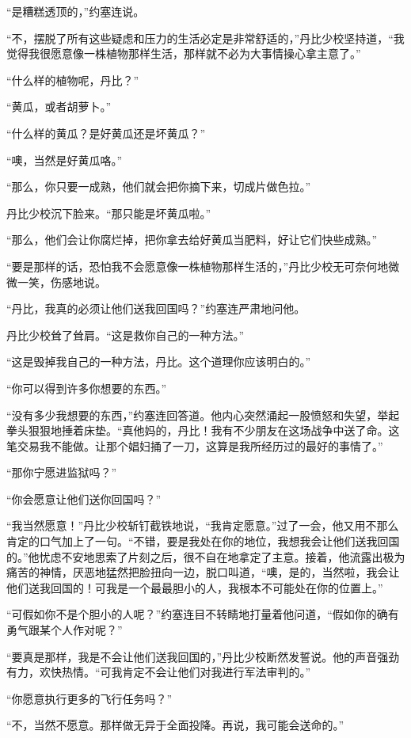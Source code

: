     “是糟糕透顶的，”约塞连说。

    “不，摆脱了所有这些疑虑和压力的生活必定是非常舒适的，”丹比少校坚持道，“我觉得我很愿意像一株植物那样生活，那样就不必为大事情操心拿主意了。”

    “什么样的植物呢，丹比？”

    “黄瓜，或者胡萝卜。”

    “什么样的黄瓜？是好黄瓜还是坏黄瓜？”

    “噢，当然是好黄瓜咯。”

    “那么，你只要一成熟，他们就会把你摘下来，切成片做色拉。”

    丹比少校沉下脸来。“那只能是坏黄瓜啦。”

    “那么，他们会让你腐烂掉，把你拿去给好黄瓜当肥料，好让它们快些成熟。”

    “要是那样的话，恐怕我不会愿意像一株植物那样生活的，”丹比少校无可奈何地微微一笑，伤感地说。

    “丹比，我真的必须让他们送我回国吗？”约塞连严肃地问他。

    丹比少校耸了耸肩。“这是救你自己的一种方法。”

    “这是毁掉我自己的一种方法，丹比。这个道理你应该明白的。”

    “你可以得到许多你想要的东西。”

    “没有多少我想要的东西，”约塞连回答道。他内心突然涌起一股愤怒和失望，举起拳头狠狠地捶着床垫。“真他妈的，丹比！我有不少朋友在这场战争中送了命。这笔交易我不能做。让那个娼妇捅了一刀，这算是我所经历过的最好的事情了。”

    “那你宁愿进监狱吗？”

    “你会愿意让他们送你回国吗？”

    “我当然愿意！”丹比少校斩钉截铁地说，“我肯定愿意。”过了一会，他又用不那么肯定的口气加上了一句。“不错，要是我处在你的地位，我想我会让他们送我回国的。”他忧虑不安地思索了片刻之后，很不自在地拿定了主意。接着，他流露出极为痛苦的神情，厌恶地猛然把脸扭向一边，脱口叫道，“噢，是的，当然啦，我会让他们送我回国的！可我是一个最最胆小的人，我根本不可能处在你的位置上。”

    “可假如你不是个胆小的人呢？”约塞连目不转睛地打量着他问道，“假如你的确有勇气跟某个人作对呢？”

    “要真是那样，我是不会让他们送我回国的，”丹比少校断然发誓说。他的声音强劲有力，欢快热情。“可我肯定不会让他们对我进行军法审判的。”

    “你愿意执行更多的飞行任务吗？”

    “不，当然不愿意。那样做无异于全面投降。再说，我可能会送命的。”

